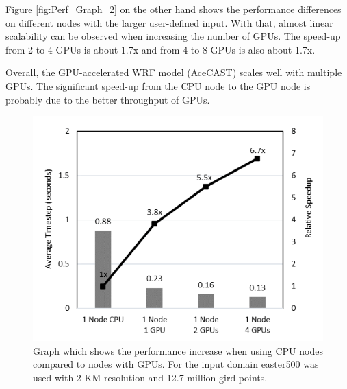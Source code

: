 \documentclass[conference]{IEEEtran}
\begin{document}
Figure \ref{fig:Perf_Graph_2} on the other hand shows the performance differences on different nodes with the larger user-defined input. With that, almost linear scalability can be observed when increasing the number of GPUs. The speed-up from 2 to 4 GPUs is about 1.7x and from 4 to 8 GPUs is also about 1.7x.

Overall, the GPU-accelerated WRF model (AceCAST) scales well with multiple GPUs. The significant speed-up from the CPU node to the GPU node is probably due to the better throughput of GPUs.\cite{b13}


\begin{figure}[H]
    \centering
    \includegraphics[scale=0.45]{Performance_one.png}
    \caption{Graph which shows the performance increase when using CPU nodes compared to nodes with GPUs. For the input domain easter500 was used with 2 KM resolution and 12.7 million gird points. \cite{b13}}
    \label{fig:Perf_Graph_1}
\end{figure}
\end{document}
